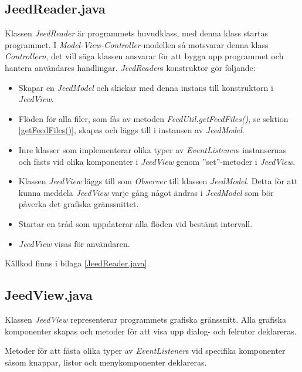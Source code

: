 \documentclass[titlepage, twoside, a4paper, 12pt]{article}
\begin{document}
\subsection{JeedReader.java}\label{JeedReader}
Klassen \textit{JeedReader} är programmets huvudklass, med denna klass
startas programmet. I \textit{Model-View-Controller}-modellen så
motsvarar denna klass \textit{Controllern}, det vill säga klassen
ansvarar för att bygga upp programmet och hantera användares
handlingar. \textit{JeedReader}s konstruktor gör följande:

\begin{itemize}
\item Skapar en \textit{JeedModel} och skickar med denna instans till
  konstruktorn i \textit{JeedView}.

\item Flöden för alla filer, som fås av metoden
  \textit{FeedUtil.getFeedFiles()}, se sektion \ref{getFeedFiles()},
  skapas och läggs till i instansen av \textit{JeedModel}.

\item Inre klasser som implementerar olika typer av
  \textit{EventListener}s instansernas och fästs vid olika komponenter
  i \textit{JeedView} genom ''set''-metoder i \textit{JeedView}.

\item Klassen \textit{JeedView} läggs till som \textit{Observer} till
  klassen \textit{JeedModel}. Detta för att kunna meddela
  \textit{JeedView} varje gång något ändras i \textit{JeedModel} som
  bör påverka det grafiska gränssnittet.

\item Startar en tråd som uppdaterar alla flöden vid bestämt
  intervall.
  
\item \textit{JeedView} visas för användaren.
\end{itemize}

Källkod finns i bilaga \ref{JeedReader.java}.

\subsection{JeedView.java}\label{JeedView}
Klassen \textit{JeedView} representerar programmets grafiska
gränssnitt. Alla grafiska komponenter skapas och metoder för att visa
upp dialog- och felrutor deklareras.

Metoder för att fästa olika typer av \textit{EventListener}s vid
specifika komponenter såsom knappar, listor och menykomponenter
deklareras.
\end{document}
